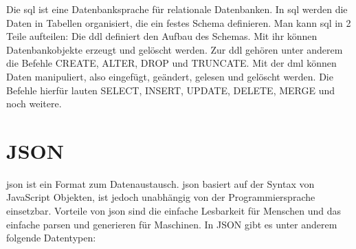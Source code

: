 Die \ac{sql} ist eine Datenbanksprache für relationale Datenbanken.
In \ac{sql} werden die Daten in Tabellen organisiert, die ein festes Schema definieren.
Man kann \ac{sql} in 2 Teile aufteilen:
Die \ac{ddl} definiert den Aufbau des Schemas.
Mit ihr können Datenbankobjekte erzeugt und gelöscht werden.
Zur \ac{ddl} gehören unter anderem die Befehle CREATE, ALTER, DROP und TRUNCATE\@.
Mit der \ac{dml} können Daten manipuliert, also eingefügt, geändert, gelesen und gelöscht werden.
Die Befehle hierfür lauten SELECT, INSERT, UPDATE, DELETE, MERGE und noch weitere.
~\autocite{schicker:datenbanken}

\section{JSON}
\label{sec:json}

\ac{json} ist ein Format zum Datenaustausch.
\ac{json} basiert auf der Syntax von JavaScript Objekten, ist jedoch unabhängig von der Programmiersprache einsetzbar.
Vorteile von \ac{json} sind die einfache Lesbarkeit für Menschen und das einfache parsen und generieren für Maschinen.
In JSON gibt es unter anderem folgende Datentypen:
~\autocite{json:json}

